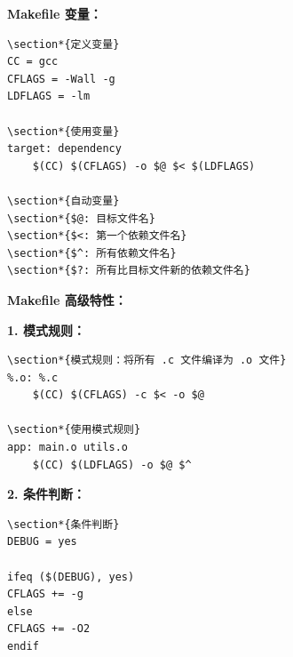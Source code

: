 \documentclass[12pt,UTF8]{ctexbook}
\begin{document}
\textbf{Makefile 变量：}
\begin{verbatim}
\section*{定义变量}
CC = gcc
CFLAGS = -Wall -g
LDFLAGS = -lm

\section*{使用变量}
target: dependency
	$(CC) $(CFLAGS) -o $@ $< $(LDFLAGS)

\section*{自动变量}
\section*{$@: 目标文件名}
\section*{$<: 第一个依赖文件名}
\section*{$^: 所有依赖文件名}
\section*{$?: 所有比目标文件新的依赖文件名}
\end{verbatim}

\textbf{Makefile 高级特性：}

\textbf{1. 模式规则：}
\begin{verbatim}
\section*{模式规则：将所有 .c 文件编译为 .o 文件}
%.o: %.c
	$(CC) $(CFLAGS) -c $< -o $@

\section*{使用模式规则}
app: main.o utils.o
	$(CC) $(LDFLAGS) -o $@ $^
\end{verbatim}

\textbf{2. 条件判断：}
\begin{verbatim}
\section*{条件判断}
DEBUG = yes

ifeq ($(DEBUG), yes)
CFLAGS += -g
else
CFLAGS += -O2
endif
\end{verbatim}
\end{document}
